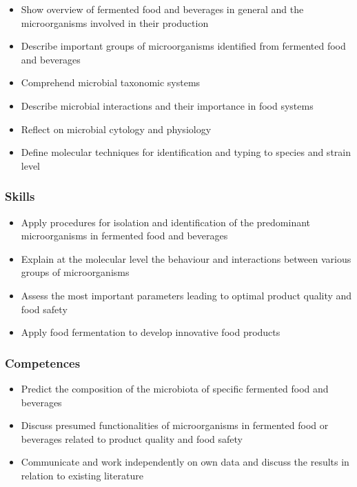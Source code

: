 \begin{highlight}
    \begin{itemize}
    \item Show overview of fermented food and beverages in general and the microorganisms involved in their production
    \item Describe important groups of microorganisms identified from fermented food and beverages
    \item Comprehend microbial taxonomic systems
    \item Describe microbial interactions and their importance in food systems
    \item Reflect on microbial cytology and physiology
    \item Define molecular techniques for identification and typing to species and strain level
\end{itemize}
\end{highlight}


 

\subsubsection{Skills} 

\begin{highlight}
    \begin{itemize}
        \item Apply procedures for isolation and identification of the predominant microorganisms in fermented food and beverages
        \item Explain at the molecular level the behaviour and interactions between various groups of microorganisms
        \item Assess the most important parameters leading to optimal product quality and food safety
        \item Apply food fermentation to develop innovative food products
    \end{itemize}
\end{highlight}
 

\subsubsection{Competences}  

\begin{highlight}
    \begin{itemize}
        \item Predict the composition of the microbiota of specific fermented food and beverages
        \item Discuss presumed functionalities of microorganisms in fermented food or beverages related to product quality and food safety
        \item Communicate and work independently on own data and discuss the results in relation to existing literature
    \end{itemize}
\end{highlight}



